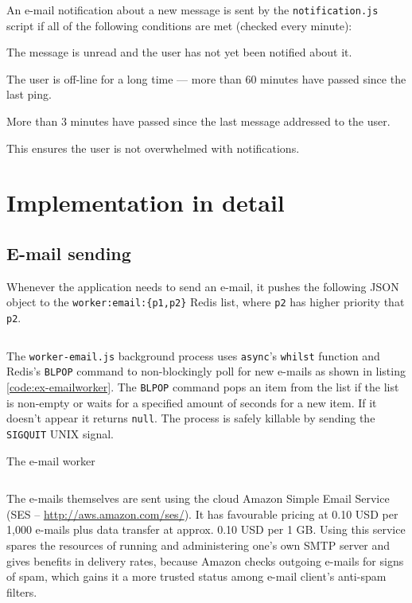 \documentclass[12pt,oneside]{fithesis}
\begin{document}
	  An e-mail notification about a new message is sent by the \texttt{notification.js} script if all of the following conditions are met (checked every minute):
	  \begin{compactitem}
	  	\item The message is unread and the user has not yet been notified about it.
	    \item The user is off-line for a long time --- more than 60 minutes have passed since the last ping.
	    \item More than 3 minutes have passed since the last message addressed to the user.
	  \end{compactitem}
	  This ensures the user is not overwhelmed with notifications.
\section{Implementation in detail}
	\subsection{E-mail sending}
		\label{section:email}
		Whenever the application needs to send an e-mail, it pushes the following JSON object to the \texttt{worker:email:\{p1,p2\}} Redis list, where \texttt{p2} has higher priority that \texttt{p2}.
		\inputminted[fontsize=\footnotesize, linenos=false]{javascript}{ex-emailobj.js}
		
		The \texttt{worker-email.js} background process uses \texttt{async}'s \texttt{whilst} function and Redis's \texttt{BLPOP} command to non-blockingly poll for new e-mails as shown in listing \ref{code:ex-emailworker}. The \texttt{BLPOP} command pops an item from the list if the list is non-empty or waits for a specified amount of seconds for a new item. If it doesn't appear it returns \texttt{null}. The process is safely killable by sending the \texttt{SIGQUIT} UNIX signal.
		
		\begin{program}[h]
		\caption{The e-mail worker}
		\label{code:ex-emailworker}
		\inputminted[fontsize=\footnotesize, linenos=false]{javascript}{ex-emailworker.js}
		\end{program}
		
		The e-mails themselves are sent using the cloud Amazon Simple Email Service (SES -- \url{http://aws.amazon.com/ses/}). It has favourable pricing at 0.10 USD per 1,000 e-mails plus data transfer at approx. 0.10 USD per 1 GB. Using this service spares the resources of running and administering one's own SMTP server and gives benefits in delivery rates, because Amazon checks outgoing e-mails for signs of spam, which gains it a more trusted status among e-mail client's anti-spam  filters.
\end{document}
